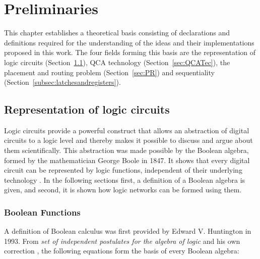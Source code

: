 \chapter{Preliminaries}\label{chapter:Preliminaries}
This chapter establishes a theoretical basis consisting of declarations and definitions required for the understanding of the ideas and their implementations proposed in this work. The four fields forming this basis are the representation of logic circuits (Section~\ref{sec:LogCirc}), QCA technology (Section~\ref{sec:QCATec}), the placement and routing problem (Section~\ref{sec:PR}) and sequentiality (Section~\ref{subsec:latchesandregisters}).

\section{Representation of logic circuits}\label{sec:LogCirc}
Logic circuits provide a powerful construct that allows an abstraction of digital circuits to a logic level and thereby makes it possible to discuss and argue about them scientifically. This abstraction was made possible by the Boolean algebra, formed by the mathematician George Boole in 1847. It shows that every digital circuit can be represented by logic functions, independent of their underlying technology \cite{halmos2009introduction}. In the following sections first, a definition of a Boolean algebra is given, and second, it is shown how logic networks can be formed using them.

\subsection{Boolean Functions}\label{subsec:boolfunc}
A definition of Boolean calculus was first provided by Edward V. Huntington in 1993. From \textit{set of independent postulates for the algebra of logic} and his own correction \cite{HuntingtonPostulate, HuntingtonCorrection}, the following equations form the basis of every Boolean algebra:

